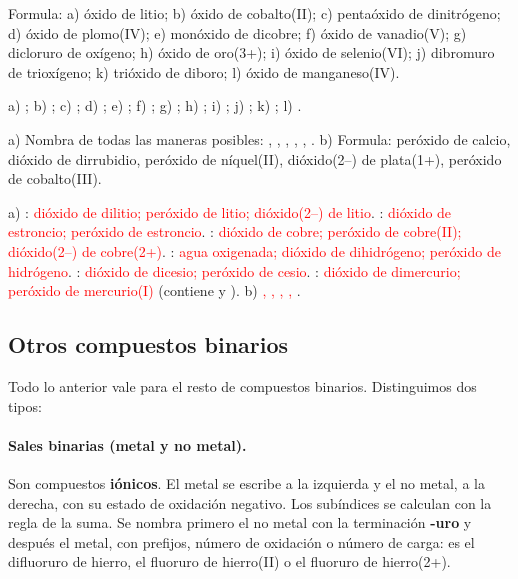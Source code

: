 \begin{exercise}
    Formula: a) óxido de litio; b) óxido de cobalto(II); c) pentaóxido de dinitrógeno; d) óxido de plomo(IV); e) monóxido de
    dicobre; f) óxido de vanadio(V); g) dicloruro de oxígeno; h) óxido de oro(3+); i) óxido de selenio(VI); j) dibromuro de
    trioxígeno; k) trióxido de diboro; l) óxido de manganeso(IV).
    \begin{solu}
        a) \textcolor{red}{}; b) \textcolor{red}{}; c) \textcolor{red}{}; d) \textcolor{red}{};
        e) \textcolor{red}{}; f) \textcolor{red}{}; g) \textcolor{red}{}; h)
        \textcolor{red}{}; i) \textcolor{red}{}; j) \textcolor{red}{}; k) \textcolor{red}{};
        l) \textcolor{red}{}.
    \end{solu}
\end{exercise}

\begin{exercise}
    a) Nombra de todas las maneras posibles: , , , , , . b) Formula:
    peróxido de calcio, dióxido de dirrubidio, peróxido de níquel(II), dióxido(2\nobreakdash--) de plata(1+), peróxido de cobalto(III).
    \begin{solu}
        a) : \textcolor{red}{dióxido de dilitio; peróxido de litio; dióxido(2\nobreakdash--) de litio}. :
        \textcolor{red}{dióxido de estroncio; peróxido de estroncio}. : \textcolor{red}{dióxido de cobre; peróxido de
        cobre(II); dióxido(2\nobreakdash--) de cobre(2+)}. : \textcolor{red}{agua oxigenada; dióxido de dihidrógeno; peróxido de
        hidrógeno}. : \textcolor{red}{dióxido de dicesio; peróxido de cesio}. : \textcolor{red}{dióxido de
        dimercurio; peróxido de mercurio(I)} (contiene  y ). b) \textcolor{red}{, ,
        , , }.
    \end{solu}
\end{exercise}

\subsection{Otros compuestos binarios}\label{sec:ud5-sales-binarias}

Todo lo anterior vale para el resto de compuestos binarios. Distinguimos dos tipos:

\paragraph{Sales binarias (metal y no metal).} Son compuestos \textbf{iónicos}. El metal se escribe a la izquierda y el no
metal, a la derecha, con su estado de oxidación negativo. Los subíndices se calculan con la regla de la suma. Se nombra primero
el no metal con la terminación \textbf{-uro} y después el metal, con prefijos, número de oxidación o número de carga: 
es el difluoruro de hierro, el fluoruro de hierro(II) o el fluoruro de hierro(2+).

